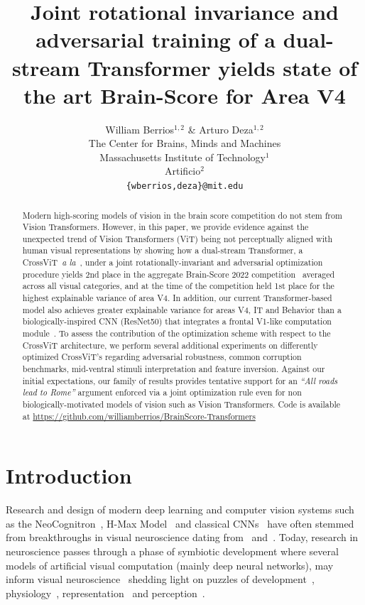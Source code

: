 \documentclass{article} %
\title{Joint rotational invariance and adversarial training of a dual-stream Transformer yields state of the art Brain-Score for Area V4}
\author{William Berrios$^{1,2}$ \& Arturo Deza$^{1,2}$ \\ 
The Center for Brains, Minds and Machines\\ Massachusetts Institute of Technology$^{1}$\\
Artificio$^{2}$ \\
\texttt{\{wberrios,deza\}@mit.edu} \\
}
\newcommand{\record}{\textcolor{BlueModel2}}
\begin{document}
\maketitle

\begin{abstract}
Modern high-scoring models of vision in the brain score competition do not stem from Vision Transformers. However, in this paper, we provide evidence against the unexpected trend of Vision Transformers (ViT) being not perceptually aligned with human visual representations by showing how a dual-stream Transformer, a CrossViT~\textit{a la}~\cite{chen2021crossvit}, under a joint rotationally-invariant and adversarial optimization procedure yields 2nd place in the aggregate Brain-Score 2022 competition~\citep{SCHRIMPF2020413} averaged across all visual categories, and at the time of the competition held 1st place for the highest explainable variance of area V4. In addition, our current Transformer-based model also achieves greater explainable variance for areas V4, IT and Behavior than a biologically-inspired CNN (ResNet50) that integrates a frontal V1-like computation module~\citep{dapello2020simulating}. To assess the contribution of the optimization scheme with respect to the CrossViT architecture, we perform several additional experiments on differently optimized CrossViT's regarding adversarial robustness, common corruption benchmarks, mid-ventral stimuli interpretation and feature inversion. %
 Against our initial expectations, our family of results provides tentative support for an \textit{``All roads lead to Rome''} argument enforced via a joint optimization rule even for non biologically-motivated models of vision such as Vision Transformers. Code is available at \record{\url{https://github.com/williamberrios/BrainScore-Transformers}}
\end{abstract}

\section{Introduction}

Research and design of modern deep learning and computer vision systems such as the NeoCognitron~\citep{fukushima1982neocognitron}, H-Max Model~\citep{serre2005theory} and classical CNNs~\citep{lecun2015deep} have often stemmed from breakthroughs in visual neuroscience dating from~\cite{kuffler1953discharge} and~\cite{hubel1962receptive}. Today, research in neuroscience passes through a phase of symbiotic development where several models of artificial visual computation (mainly deep neural networks), may inform visual neuroscience~\citep{richards2019deep} shedding light on puzzles of development~\citep{lindsey2018the}, physiology~\citep{dapello2020simulating}, representation~\citep{jagadeesh2022texture} and perception~\citep{harrington2022finding}.
\end{document}
